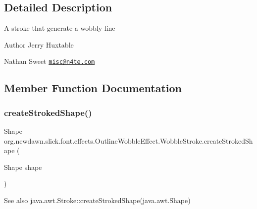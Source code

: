 \subsection{Detailed Description}
A stroke that generate a wobbly line

\begin{DoxyAuthor}{Author}
Jerry Huxtable 

Nathan Sweet \href{mailto:misc@n4te.com}{\tt misc@n4te.\+com} 
\end{DoxyAuthor}


\subsection{Member Function Documentation}
\mbox{\label{classorg_1_1newdawn_1_1slick_1_1font_1_1effects_1_1_outline_wobble_effect_1_1_wobble_stroke_a1f409e24e06e974e42cf454f3763814a}} 
\subsubsection{\texorpdfstring{create\+Stroked\+Shape()}{createStrokedShape()}}
{\footnotesize\ttfamily Shape org.\+newdawn.\+slick.\+font.\+effects.\+Outline\+Wobble\+Effect.\+Wobble\+Stroke.\+create\+Stroked\+Shape (\begin{DoxyParamCaption}\item[{Shape}]{shape }\end{DoxyParamCaption})\hspace{0.3cm}{\ttfamily [inline]}}

\begin{DoxySeeAlso}{See also}
java.\+awt.\+Stroke\+::create\+Stroked\+Shape(java.\+awt.\+Shape) 
\end{DoxySeeAlso}

